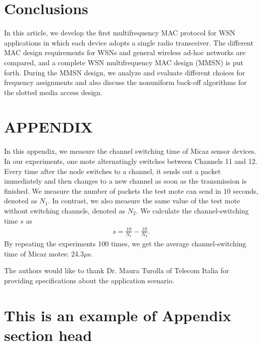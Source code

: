 \documentclass[prodmode,acmtecs]{acmsmall}
\begin{document}
\begin{algorithm}
\begin{algorithmic}[1]
\section{Conclusions}

In this article, we develop the first multifrequency MAC protocol for
WSN applications in which each device adopts a
single radio transceiver. The different MAC design requirements for
WSNs and general wireless ad-hoc networks are
compared, and a complete WSN multifrequency MAC design (MMSN) is
put forth. During the MMSN design, we analyze and evaluate different
choices for frequency assignments and also discuss the nonuniform
back-off algorithms for the slotted media access design.

\appendix
\section*{APPENDIX}
\setcounter{section}{1}
In this appendix, we measure
the channel switching time of Micaz \cite{CROSSBOW} sensor devices.
In our experiments, one mote alternatingly switches between Channels
11 and 12. Every time after the node switches to a channel, it sends
out a packet immediately and then changes to a new channel as soon
as the transmission is finished. We measure the
number of packets the test mote can send in 10 seconds, denoted as
$N_{1}$. In contrast, we also measure the same value of the test
mote without switching channels, denoted as $N_{2}$. We calculate
the channel-switching time $s$ as
\begin{eqnarray}%
s=\frac{10}{N_{1}}-\frac{10}{N_{2}}. \nonumber
\end{eqnarray}%
By repeating the experiments 100 times, we get the average
channel-switching time of Micaz motes: 24.3$\mu$s.


\begin{acks}
The authors would like to thank Dr. Maura Turolla of Telecom
Italia for providing specifications about the application scenario.
\end{acks}





\elecappendix

\medskip

\section{This is an example of Appendix section head}


\end{algorithmic}
\end{algorithm}
\end{document}
